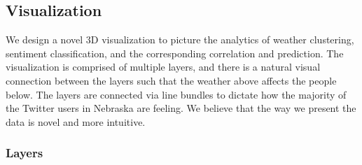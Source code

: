 %
%
%




\subsection{Visualization}
\label{sec:vis}

We design a novel 3D visualization to picture the analytics of weather clustering, sentiment classification, and the corresponding correlation and prediction. The visualization is comprised of multiple layers, and there is a natural visual connection between the layers such that the weather above affects the people below.
The layers are connected via line bundles to dictate how the majority of the Twitter users in Nebraska are feeling. We believe that the way we present the data is novel and more intuitive.

\subsubsection{Layers}

